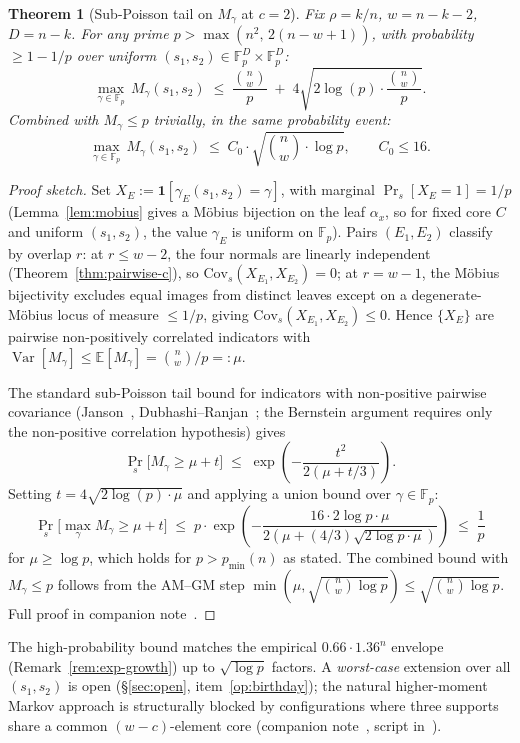 \documentclass[11pt]{article}
\newtheorem{theorem}{Theorem}
\newcommand{\FF}{\mathbb{F}}
\newcommand{\EE}{\mathbb{E}}
\DeclareMathOperator{\Var}{Var}
\begin{document}
\begin{theorem}[Sub-Poisson tail on $M_\gamma$ at $c = 2$]
\label{thm:birthday-expected}
Fix $\rho = k/n$, $w = n - k - 2$, $D = n - k$. For any prime
$p > \max(n^2,\, 2(n-w+1))$, with probability $\geq 1 - 1/p$ over
uniform $(s_1, s_2) \in \FF_p^D \times \FF_p^D$:
\[
   \max_{\gamma \in \FF_p}\, M_\gamma(s_1, s_2) \;\leq\; \frac{\binom{n}{w}}{p} \;+\; 4\sqrt{2 \log(p) \cdot \frac{\binom{n}{w}}{p}}.
\]
Combined with $M_\gamma \leq p$ trivially, in the same probability event:
\[
   \max_{\gamma \in \FF_p}\, M_\gamma(s_1, s_2) \;\leq\; C_0 \cdot \sqrt{\binom{n}{w} \cdot \log p}, \qquad C_0 \leq 16.
\]
\end{theorem}

\begin{proof}[Proof sketch]
Set $X_E := \mathbf{1}[\gamma_E(s_1, s_2) = \gamma]$, with marginal
$\Pr_s[X_E = 1] = 1/p$ (Lemma~\ref{lem:mobius} gives a M\"obius bijection
on the leaf $\alpha_x$, so for fixed core $C$ and uniform $(s_1, s_2)$,
the value $\gamma_E$ is uniform on $\FF_p$). Pairs $(E_1, E_2)$ classify
by overlap $r$: at $r \leq w-2$, the four normals are linearly
independent (Theorem~\ref{thm:pairwise-c}), so $\mathrm{Cov}_s(X_{E_1}, X_{E_2}) = 0$;
at $r = w-1$, the M\"obius bijectivity excludes equal images from distinct
leaves except on a degenerate-M\"obius locus of measure $\leq 1/p$, giving
$\mathrm{Cov}_s(X_{E_1}, X_{E_2}) \leq 0$. Hence $\{X_E\}$ are pairwise non-positively
correlated indicators with $\Var[M_\gamma] \leq \EE[M_\gamma] = \binom{n}{w}/p =: \mu$.

The standard sub-Poisson tail bound for indicators with non-positive
pairwise covariance (Janson~\cite{Janson02}, Dubhashi--Ranjan~\cite{DubhashiRanjan98}; the
Bernstein argument requires only the non-positive correlation hypothesis)
gives
\[
   \Pr_s\bigl[M_\gamma \geq \mu + t\bigr] \;\leq\; \exp\!\left(-\frac{t^2}{2(\mu + t/3)}\right).
\]
Setting $t = 4\sqrt{2 \log(p) \cdot \mu}$ and applying a union bound over
$\gamma \in \FF_p$:
\[
   \Pr_s\bigl[\max_\gamma M_\gamma \geq \mu + t\bigr] \;\leq\; p \cdot \exp\!\left(-\frac{16 \cdot 2 \log p \cdot \mu}{2(\mu + (4/3)\sqrt{2 \log p \cdot \mu})}\right) \;\leq\; \frac{1}{p}
\]
for $\mu \geq \log p$, which holds for $p > p_{\min}(n)$ as stated. The
combined bound with $M_\gamma \leq p$ follows from the AM--GM step
$\min(\mu, \sqrt{\binom{n}{w} \log p}) \leq \sqrt{\binom{n}{w} \log p}$.
Full proof in companion note~\cite{Note0092}.
\end{proof}

The high-probability bound matches the empirical $0.66 \cdot 1.36^n$
envelope (Remark~\ref{rem:exp-growth}) up to $\sqrt{\log p}$ factors. A
\emph{worst-case} extension over all $(s_1, s_2)$ is open
(\S\ref{sec:open}, item~\ref{op:birthday}); the natural higher-moment
Markov approach is structurally blocked by configurations where three
supports share a common $(w{-}c)$-element core (companion note~\cite{Note0092},
script in~\cite{CompanionRepo}).
\end{document}
